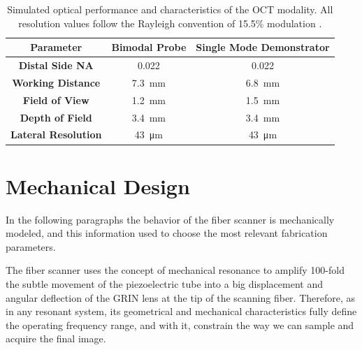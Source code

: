 \begin{table}[h!]\centering
	\begin{tabular}{ccc}\\
		\textbf{Parameter} & \textbf{Bimodal Probe} & \textbf{Single Mode Demonstrator} \\ 
		\hline
		\textbf{Distal Side NA} & 0.022 & 0.022 \\ 
		\textbf{Working Distance} & \SI{7.3}{\milli\meter} &  \SI{6.8}{\milli\meter} \\ 
		\textbf{Field of View} & \SI{1.2}{\milli\meter} &  \SI{1.5}{\milli\meter}\\ 
		\textbf{Depth of Field} & \SI{3.4}{\milli\meter}& \SI{3.4}{\milli\meter} \\ 
		\textbf{Lateral Resolution} & \SI{43}{\micro\meter} & \SI{43}{\micro\meter}\\ 
		\hline
	\end{tabular} 
    \caption{Simulated optical performance and characteristics of the OCT modality. All resolution values follow the Rayleigh convention of 15.5\% modulation \cite{Kretschmer}.}
    \label{tab:simRes}
\end{table}



\section{Mechanical Design}
\label{sec:mechDesign}

In the following paragraphs the behavior of the fiber scanner is mechanically modeled, and this information used to choose the most relevant fabrication parameters.

The fiber scanner uses the concept of mechanical resonance to amplify 100-fold the subtle movement of the piezoelectric tube into a big displacement and angular deflection of the GRIN lens at the tip of the scanning fiber. Therefore, as in any resonant system, its geometrical and mechanical characteristics fully define the operating frequency range, and with it, constrain the way we can sample and acquire the final image.

